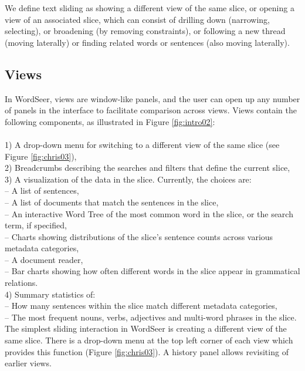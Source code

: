 \documentclass{sig-alternate}
\begin{document}
We define text sliding as showing a different view of the same slice, or opening a  view of an associated slice, which can consist of drilling down (narrowing, selecting), or broadening (by removing constraints), or following a new thread (moving laterally) or finding related words or sentences  (also moving laterally).

\subsection{Views}
In WordSeer, views  are window-like panels, and the user can open up any number of panels in the interface to facilitate comparison across views.  Views contain the following components, as illustrated in Figure \ref{fig:intro02}:
\\
\\ 1) A drop-down menu for switching to a different view of the same slice (see Figure \ref{fig:chris03}),
\\ 2) Breadcrumbs describing the searches and filters that define the current slice,
\\ 3)  A visualization of the data in the slice. Currently, the choices are:
\\ \indent -- A list of sentences,
\\ \indent -- A list of documents that match the sentences in the slice,
\\ \indent -- An interactive Word Tree \cite{wattenberg_word_2008} of the most common word in the slice, or the search term, if specified,
\\ \indent -- Charts showing distributions of the slice's sentence counts across various metadata categories,
\\ \indent -- A document reader,
\\ \indent -- Bar charts showing how often different words in the slice  appear in grammatical relations.
\\ 4) Summary statistics of:
\\ \indent -- How many sentences within the slice match different metadata categories,
\\ \indent -- The most frequent nouns, verbs, adjectives and multi-word phrases in the slice.
\\

The simplest sliding interaction in WordSeer is creating a different view of the same slice.  There is a drop-down menu at the top left corner of each view which provides this function (Figure \ref{fig:chris03}). A history panel allows revisiting of earlier views.  
\end{document}
